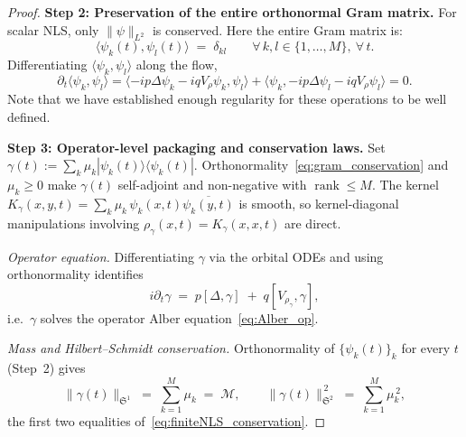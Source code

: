 \documentclass[11pt]{amsart}
\theoremstyle{definition}
\newcommand{\Sp}{\mathfrak{S}}
\begin{document}
\begin{proof}
\smallskip

\noindent\textbf{Step 2: Preservation of the entire orthonormal Gram matrix.} For scalar NLS, only $\|\psi\|_{L^2}$ is conserved. Here the entire Gram matrix is:
\begin{equation}\label{eq:gram_conservation}
  \langle\psi_k(t),\psi_l(t)\rangle\;=\;\delta_{kl}
  \qquad\forall\,k,l\in\{1,\dots,M\},\ \forall\,t.
\end{equation}
Differentiating $\langle\psi_k,\psi_l\rangle$ along the flow,
\[
  \partial_t\langle\psi_k,\psi_l\rangle
  =\langle-ip\Delta\psi_k-iqV_\rho\psi_k,\psi_l\rangle
  +\langle\psi_k,-ip\Delta\psi_l-iqV_\rho\psi_l\rangle
  =0.
\]
Note that we have established enough regularity for these operations to be well defined.

\smallskip

\noindent\textbf{Step 3: Operator-level packaging and conservation laws.} Set $\gamma(t):=\sum_k\mu_k|\psi_k(t)\rangle\langle\psi_k(t)|.$ Orthonormality~\eqref{eq:gram_conservation} and $\mu_k\ge 0$ make $\gamma(t)$ self-adjoint and non-negative with $\operatorname{rank}\le M.$ The kernel $K_\gamma(x,y,t)=\sum_k\mu_k\,\psi_k(x,t)\overline{\psi_k(y,t)}$ is smooth, so kernel-diagonal manipulations involving $\rho_\gamma(x,t)=K_\gamma(x,x,t)$ are direct.

\smallskip

\noindent\emph{Operator equation.} Differentiating $\gamma$ via the orbital ODEs and using orthonormality identifies
\[
  i\partial_t\gamma\;=\;p[\Delta,\gamma]\;+\;q[V_{\rho_\gamma},\gamma],
\]
i.e.\ $\gamma$ solves the operator Alber equation~\eqref{eq:Alber_op}.

\smallskip

\noindent\emph{Mass and Hilbert--Schmidt conservation.} Orthonormality of $\{\psi_k(t)\}_k$ for every $t$ (Step~2) gives
\[
  \|\gamma(t)\|_{\Sp^1}\;=\;\sum_{k=1}^M\mu_k\;=\;\mathcal{M},
  \qquad
  \|\gamma(t)\|_{\Sp^2}^{\,2}\;=\;\sum_{k=1}^M\mu_k^{\,2},
\]
the first two equalities of~\eqref{eq:finiteNLS_conservation}.

\smallskip


\end{proof}
\end{document}

